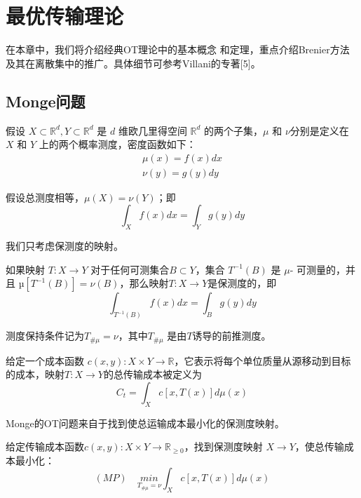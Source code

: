 
\section{最优传输理论}

在本章中，我们将介绍经典OT理论中的基本概念
和定理，重点介绍Brenier方法及其在离散集中的推广。具体细节可参考Villani的专著[5]。

\subsection{Monge问题}

假设 $X \subset \mathbb{R}^d, Y \subset \mathbb{R}^d $ 是 $ d $ 维欧几里得空间 $ \mathbb{R}^d $ 的两个子集，$\mu$ 和 $\nu$分别是定义在 $X$ 和 $Y$ 上的两个概率测度，密度函数如下：
\begin{equation*}
	\begin{array}{c} 
		\mu(x) =f(x)dx \\ 
		\nu (y) =g(y)dy 
	\end{array}
\end{equation*}

假设总测度相等，$\mu(X)=\nu(Y)$；即
\begin{equation}
	\int_X f(x)dx =\int_Y g(y)dy
	\label{function:1}
\end{equation}

我们只考虑保测度的映射。

\begin{definition}[保留测度映射]	\label{def:3.1}
	如果映射 $T: X \to Y $ 对于任何可测集合$B \subset Y $，集合 $T^{-1}(B)$ 是 $\mu$- 可测量的，并且 $µ[T^{-1}(B)]=\nu(B)$，那么映射$T: X \to Y$是保测度的，即
	\begin{equation}
		\int_{T^{-1}(B)} f(x)dx =\int_B g(y)dy
		\label{function:2}
	\end{equation}

	测度保持条件记为$T_{\# \mu}=\nu$，其中$T_{\#\mu}$ 是由$T$诱导的前推测度。
\end{definition}

给定一个成本函数 $c(x,y): X \times Y \to \mathbb{R} $，它表示将每个单位质量从源移动到目标的成本，映射$T: X \to Y$的总传输成本被定义为
\begin{equation}
	C_t=\int_X c[x,T(x)]d\mu (x) 
	\label{function:3}
\end{equation}

Monge的OT问题来自于找到使总运输成本最小化的保测度映射。

\begin{problem}[Monge【43】;MP]	\label{problem:3.1}
	给定传输成本函数$c(x,y): X \times Y\to\mathbb{R}_{\ge 0}$，找到保测度映射 $X \to Y$，使总传输成本最小化：
	\begin{equation}
		(MP) \quad \underset{T_{\# \mu}=\nu}{min} \int_X c[x,T(x)]d\mu(x)  
		\label{function:4}
	\end{equation}
\end{problem}


